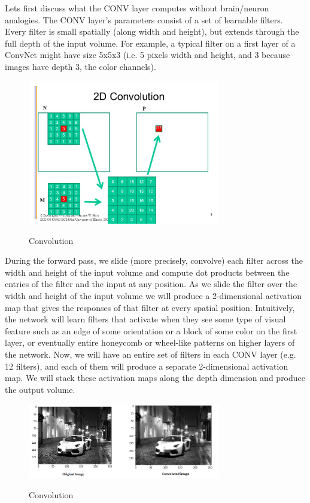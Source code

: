 \documentclass[12pt]{article}
\begin{document}
		 Lets first discuss what the CONV layer computes without brain/neuron analogies. The CONV layer’s parameters consist of a set of learnable filters. Every filter is small spatially (along width and height), but extends through the full depth of the input volume. For example, a typical filter on a first layer of a ConvNet might have size 5x5x3 (i.e. 5 pixels width and height, and 3 because images have depth 3, the color channels).
\begin{figure}[h]
    	\centering
    	\includegraphics[width=0.75\textwidth]{2d.jpg}
       	\label{fig:mesh11}
	\caption{Convolution}
	\end{figure}

		 
		  During the forward pass, we slide (more precisely, convolve) each filter across the width and height of the input volume and compute dot products between the entries of the filter and the input at any position. As we slide the filter over the width and height of the input volume we will produce a 2-dimensional activation map that gives the responses of that filter at every spatial position. Intuitively, the network will learn filters that activate when they see some type of visual feature such as an edge of some orientation or a block of some color on the first layer, or eventually entire honeycomb or wheel-like patterns on higher layers of the network. Now, we will have an entire set of filters in each CONV layer (e.g. 12 filters), and each of them will produce a separate 2-dimensional activation map. We will stack these activation maps along the depth dimension and produce the output volume.
		         
        
        \begin{figure}[h]
    	\centering
    	\includegraphics[width=0.75\textwidth]{convimages.png}
       	\label{fig:mesh12}
	\caption{Convolution}
	\end{figure} 
	
\end{document}
